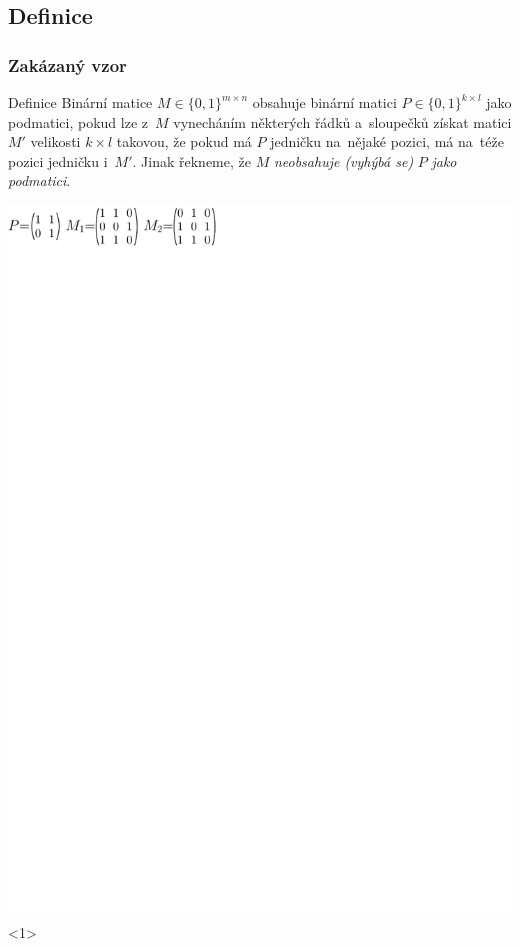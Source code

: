 \documentclass{beamer}
\begin{document}
\subsection{Definice}
\begin{frame}
\frametitle{Zakázaný vzor}
\begin{block}{Definice}
Binární matice $M\in\{0,1\}^{m\times n}$ \alert{obsahuje} binární matici $P\in\{0,1\}^{k\times l}$ \alert{jako podmatici}, pokud lze z~$M$ vynecháním některých řádků a~sloupečků získat matici $M'$ velikosti $k\times l$ takovou, že pokud má $P$ jedničku na~nějaké pozici, má na~téže pozici jedničku i~$M'$. Jinak řekneme, že $M$ \emph{neobsahuje (vyhýbá se)} $P$ \emph{jako podmatici}.
\end{block}
\vspace{5mm}
\centering
\includegraphics{../img/example.pdf}<1>

\end{frame}
\end{document}

